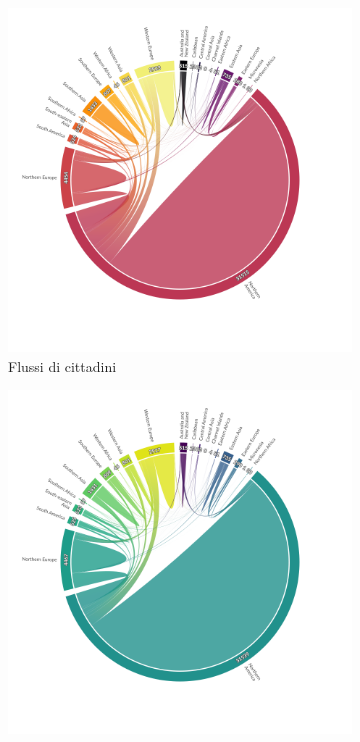 \begin{figure}[tbp]
    \begin{subfigure}{0.48\textwidth}
        \includegraphics[scale=0.34]{images/SVG/Chords/Crunchbase/Crunchbase_Cit_Red.png}
        \caption{Flussi di cittadini}
        \label{fig:chordCrunchbase_cit}
    \end{subfigure}
    \begin{subfigure}{0.48\textwidth}
        \includegraphics[scale=0.34]{images/SVG/Chords/Crunchbase/Crunchbase_Res_Blue.png}

\end{subfigure}
\end{figure}
